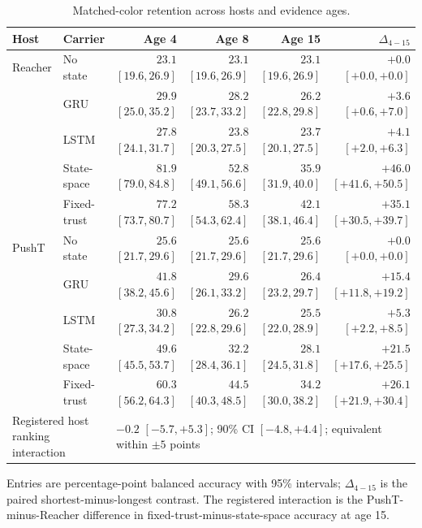 \begin{table}[H]
\centering
\scriptsize
\setlength{\tabcolsep}{4pt}
\renewcommand{\arraystretch}{1.10}
\caption{Matched-color retention across hosts and evidence ages.}
\label{tab:appendix-matched-color}
\begin{tabular}{llrrrr}
\toprule
Host & Carrier & Age 4 & Age 8 & Age 15 & $\Delta_{4-15}$ \\
\midrule
Reacher & No state & $23.1$ $[19.6,26.9]$ & $23.1$ $[19.6,26.9]$ & $23.1$ $[19.6,26.9]$ & $+0.0$ $[+0.0,+0.0]$ \\
 & GRU & $29.9$ $[25.0,35.2]$ & $28.2$ $[23.7,33.2]$ & $26.2$ $[22.8,29.8]$ & $+3.6$ $[+0.6,+7.0]$ \\
 & LSTM & $27.8$ $[24.1,31.7]$ & $23.8$ $[20.3,27.5]$ & $23.7$ $[20.1,27.5]$ & $+4.1$ $[+2.0,+6.3]$ \\
 & State-space & $81.9$ $[79.0,84.8]$ & $52.8$ $[49.1,56.6]$ & $35.9$ $[31.9,40.0]$ & $+46.0$ $[+41.6,+50.5]$ \\
 & Fixed-trust & $77.2$ $[73.7,80.7]$ & $58.3$ $[54.3,62.4]$ & $42.1$ $[38.1,46.4]$ & $+35.1$ $[+30.5,+39.7]$ \\
\addlinespace[2pt]
PushT & No state & $25.6$ $[21.7,29.6]$ & $25.6$ $[21.7,29.6]$ & $25.6$ $[21.7,29.6]$ & $+0.0$ $[+0.0,+0.0]$ \\
 & GRU & $41.8$ $[38.2,45.6]$ & $29.6$ $[26.1,33.2]$ & $26.4$ $[23.2,29.7]$ & $+15.4$ $[+11.8,+19.2]$ \\
 & LSTM & $30.8$ $[27.3,34.2]$ & $26.2$ $[22.8,29.6]$ & $25.5$ $[22.0,28.9]$ & $+5.3$ $[+2.2,+8.5]$ \\
 & State-space & $49.6$ $[45.5,53.7]$ & $32.2$ $[28.4,36.1]$ & $28.1$ $[24.5,31.8]$ & $+21.5$ $[+17.6,+25.5]$ \\
 & Fixed-trust & $60.3$ $[56.2,64.3]$ & $44.5$ $[40.3,48.5]$ & $34.2$ $[30.0,38.2]$ & $+26.1$ $[+21.9,+30.4]$ \\
\midrule
\multicolumn{2}{l}{Registered host ranking interaction} & \multicolumn{4}{l}{$-0.2$ $[-5.7,+5.3]$; 90\% CI $[-4.8,+4.4]$; equivalent within $\pm5$ points} \\
\bottomrule
\end{tabular}
\vspace{2pt}
\parbox{0.98\textwidth}{\scriptsize Entries are percentage-point balanced accuracy with 95\% intervals; $\Delta_{4-15}$ is the paired shortest-minus-longest contrast. The registered interaction is the PushT-minus-Reacher difference in fixed-trust-minus-state-space accuracy at age 15.}
\end{table}

